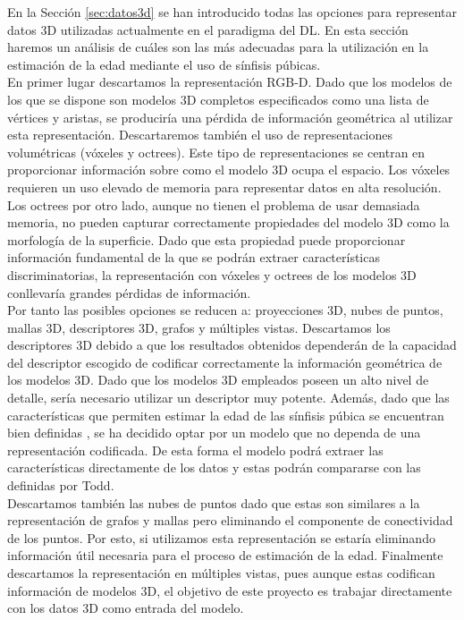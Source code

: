 En la Sección \ref{sec:datos3d} se han introducido todas las opciones para representar datos 3D utilizadas actualmente en el paradigma del DL. En esta sección haremos un análisis de cuáles son las más adecuadas para la utilización en la estimación de la edad mediante el uso de sínfisis púbicas.
\\

En primer lugar descartamos la representación RGB-D. Dado que los modelos de los que se dispone son modelos 3D completos especificados como una lista de vértices y aristas, se produciría una pérdida de información geométrica al utilizar esta representación. Descartaremos también el uso de representaciones volumétricas (vóxeles y octrees). Este tipo de representaciones se centran en proporcionar información sobre como el modelo 3D ocupa el espacio. Los vóxeles requieren un uso elevado de memoria para representar datos en alta resolución. Los octrees por otro lado, aunque no tienen el problema de usar demasiada memoria, no pueden capturar correctamente propiedades del modelo 3D como la morfología de la superficie. Dado que esta propiedad puede proporcionar información fundamental de la que se podrán extraer características discriminatorias, la representación con vóxeles y octrees de los modelos 3D conllevaría grandes pérdidas de información.
\\

Por tanto las posibles opciones se reducen a: proyecciones 3D, nubes de puntos, mallas 3D, descriptores 3D, grafos y múltiples vistas. Descartamos los descriptores 3D debido a que los resultados obtenidos dependerán de la capacidad del descriptor escogido de codificar correctamente la información geométrica de los modelos 3D. Dado que los modelos 3D empleados poseen un alto nivel de detalle, sería necesario utilizar un descriptor muy potente. Además, dado que las características que permiten estimar la edad de las sínfisis púbica se encuentran bien definidas \cite{todd1921age}, se ha decidido optar por un modelo que no dependa de una representación codificada. De esta forma el modelo podrá extraer las características directamente de los datos y estas podrán compararse con las definidas por Todd. \\


Descartamos también las nubes de puntos dado que estas son similares a la representación de grafos y mallas pero eliminando el componente de conectividad de los puntos. Por esto, si utilizamos esta representación se estaría eliminando información útil necesaria para el proceso de estimación de la edad. Finalmente descartamos la representación en múltiples vistas, pues aunque estas codifican información de modelos 3D, el objetivo de este proyecto es trabajar directamente con los datos 3D como entrada del modelo.
\\

